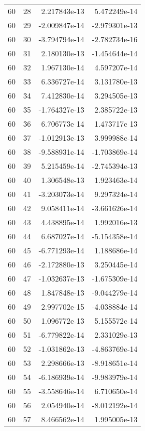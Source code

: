\begin{tabular}{rrrr}
  60 &   28 &  2.217843e-13 &  5.472249e-14 \\
  60 &   29 & -2.009847e-14 & -2.979301e-13 \\
  60 &   30 & -3.794794e-14 & -2.782734e-16 \\
  60 &   31 &  2.180130e-13 & -1.454644e-14 \\
  60 &   32 &  1.967130e-14 &  4.597207e-14 \\
  60 &   33 &  6.336727e-14 &  3.131780e-13 \\
  60 &   34 &  7.412830e-14 &  3.294505e-13 \\
  60 &   35 & -1.764327e-13 &  2.385722e-13 \\
  60 &   36 & -6.706773e-14 & -1.473717e-13 \\
  60 &   37 & -1.012913e-13 &  3.999988e-14 \\
  60 &   38 & -9.588931e-14 & -1.703869e-14 \\
  60 &   39 &  5.215459e-14 & -2.745394e-13 \\
  60 &   40 &  1.306548e-13 &  1.923463e-14 \\
  60 &   41 & -3.203073e-14 &  9.297324e-14 \\
  60 &   42 &  9.058411e-14 & -3.661626e-14 \\
  60 &   43 &  4.438895e-14 &  1.992016e-13 \\
  60 &   44 &  6.687027e-14 & -5.154358e-14 \\
  60 &   45 & -6.771293e-14 &  1.188686e-14 \\
  60 &   46 & -2.172880e-13 &  3.250445e-14 \\
  60 &   47 & -1.032637e-13 & -1.675309e-14 \\
  60 &   48 &  1.847848e-13 & -9.044279e-14 \\
  60 &   49 &  2.997702e-15 & -4.038884e-14 \\
  60 &   50 &  1.096772e-13 &  5.155572e-14 \\
  60 &   51 & -6.779822e-14 &  2.331029e-13 \\
  60 &   52 & -1.031862e-13 & -4.863769e-14 \\
  60 &   53 &  2.298666e-13 & -8.918651e-14 \\
  60 &   54 & -6.186939e-14 & -9.983979e-14 \\
  60 &   55 & -3.558646e-14 &  6.710650e-14 \\
  60 &   56 &  2.054940e-14 & -8.012192e-14 \\
  60 &   57 &  8.466562e-14 &  1.995005e-13 \\

\end{tabular}
